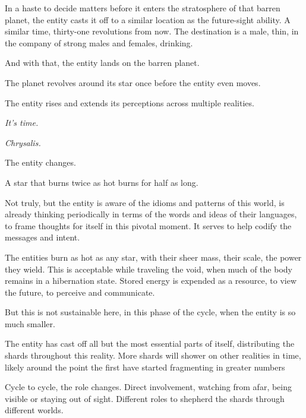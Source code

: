 In a haste to decide matters before it enters the stratosphere of that barren planet, the entity casts it off to a similar location as the future-sight ability.  A similar time, thirty-one revolutions from now.  The destination is a male, thin, in the company of strong males and females, drinking.



And with that, the entity lands on the barren planet.



The planet revolves around its star once before the entity even moves.



The entity rises and extends its perceptions across multiple realities.



\emph{It's time.}



\emph{Chrysalis.}



The entity changes.



A star that burns twice as hot burns for half as long.



Not truly, but the entity is aware of the idioms and patterns of this world, is already thinking periodically in terms of the words and ideas of their languages, to frame thoughts for itself in this pivotal moment.  It serves to help codify the messages and intent.



The entities burn as hot as any star, with their sheer mass, their scale, the power they wield.  This is acceptable while traveling the void, when much of the body remains in a hibernation state.  Stored energy is expended as a resource, to view the future, to perceive and communicate.



But this is not sustainable here, in this phase of the cycle, when the entity is so much smaller.



The entity has cast off all but the most essential parts of itself, distributing the shards throughout this reality.  More shards will shower on other realities in time, likely around the point the first have started fragmenting in greater numbers



Cycle to cycle, the role changes.  Direct involvement, watching from afar, being visible or staying out of sight.  Different roles to shepherd the shards through different worlds.



